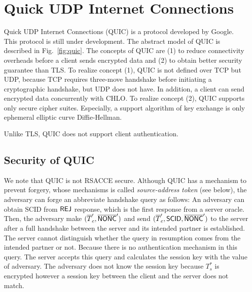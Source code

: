 \section{Quick UDP Internet Connections} \label{sec:quic}

Quick UDP Internet Connections (QUIC) is a protocol developed by Google. This protocol is still under development. The abstract model of QUIC is described in Fig.~\ref{fig:quic}. The concepts of QUIC are (1) to reduce connectivity overheads before a client sends encrypted data and (2) to obtain better security guarantee than TLS.
To realize concept (1), QUIC is not defined over TCP but UDP, because TCP requires three-move handshake before initiating a cryptographic handshake, but UDP does not have. In addition, a client can send encrypted data concurrently with CHLO.
To realize concept (2), QUIC supports only secure cipher suites. Especially, a support algorithm of key exchange is only ephemeral elliptic curve Diffie-Hellman.

Unlike TLS, QUIC does not support client authentication.

\subsection{Security of QUIC} \label{sec:quic_detail}




We note that QUIC is not RSACCE secure.
Although QUIC has a mechanism to prevent forgery,
whose mechanisms is called \textit{source-address token} (see below),
the adversary can forge an abbreviate handshake query as follows:
An adversary can obtain SCID from $\mathsf{REJ}$ response,
which is the first response from a server oracle.
Then, the adversary make $(\overline{T}_c^{\prime}, \overline{\mathsf{NONC}}^{\prime})$
and send $(\overline{T}_c^{\prime}, \mathsf{SCID}, \overline{\mathsf{NONC}}^{\prime})$ to the
server after a full handshake between the server and its intended partner is established.
The server cannot distinguish whether the query in resumption comes from
the intended partner or not. Because there is no authentication
mechanism in this query. The server accepts this query and calculates
the session key with the value of adversary. The adversary does not
know the session key because $T_s^{\ast}$ is encrypted however a
session key between the client and the server does not match.

